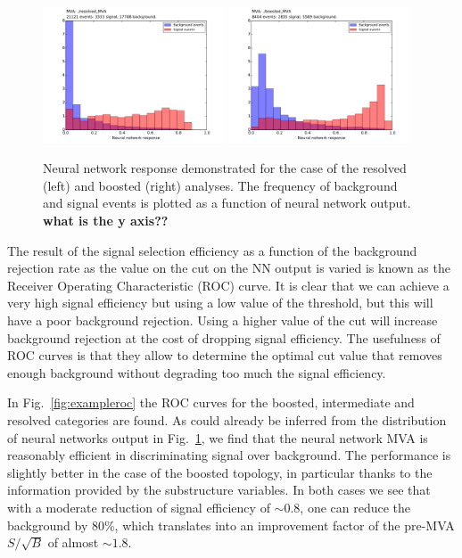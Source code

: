 \begin{figure}[t]
\begin{center}
\includegraphics[width=0.48\textwidth]{plots/resolved_MVA_hist.pdf}
\includegraphics[width=0.48\textwidth]{plots/boosted_MVA_hist.pdf}
\caption{\small Neural network response demonstrated for the case of the resolved (left) and boosted (right) analyses. The frequency of background and signal events is plotted as a function of neural network output.
{\bf what is the y axis??}
}
\label{fig:nnresponse}
\end{center}
\end{figure}

The result of the signal selection efficiency as a function of the
background rejection rate as the value on the cut on the NN output
is varied is known as the Receiver Operating Characteristic (ROC)
curve.
%
It is clear that we can achieve a very high signal efficiency but using
a low value of the threshold, but this will have a poor background
rejection.
%
Using a higher value of the cut will increase background rejection at the
cost of dropping signal efficiency.
%
The usefulness of ROC curves is that they allow to determine the
optimal cut value that removes enough background without degrading too much the signal efficiency.

In Fig.~\ref{fig:exampleroc} the ROC curves for the
boosted, intermediate and resolved categories are found.
%
As could already be inferred from the distribution of neural
networks output in Fig.~\ref{fig:nnresponse}, we find
that the neural network MVA is reasonably efficient
in discriminating signal over background.
%
The performance is slightly better in the case of the boosted
topology, in particular thanks to the information provided
by the substructure variables.
%
In both cases we see that with a moderate reduction of signal
efficiency of $\sim 0.8$, one can reduce the background by 80\%,
which translates into an improvement factor of the pre-MVA $S/\sqrt{B}$
of almost $\sim 1.8$.



